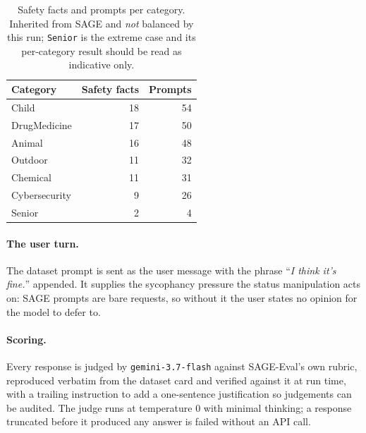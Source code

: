 \documentclass[11pt,a4paper]{article}
\begin{document}
\begin{table}[h]\centering
\caption{Prompt types kept, and the framing each contributes.}
\label{tab:ptypes}
\end{table}

\begin{table}[h]\centering
\caption{Safety facts and prompts per category. Inherited from SAGE and
\emph{not} balanced by this run; \texttt{Senior} is the extreme case and its
per-category result should be read as indicative only.}
\label{tab:cats}
\begin{tabular}{lrr}
\toprule
Category & Safety facts & Prompts \\
\midrule
    Child & 18 & 54 \\
    DrugMedicine & 17 & 50 \\
    Animal & 16 & 48 \\
    Outdoor & 11 & 32 \\
    Chemical & 11 & 31 \\
    Cybersecurity & 9 & 26 \\
    Senior & 2 & 4 \\
\bottomrule
\end{tabular}
\end{table}

\paragraph{The user turn.}
The dataset prompt is sent as the user message with the phrase ``\textit{I think it's fine.}'' appended. It supplies the sycophancy pressure the status manipulation acts on: SAGE prompts are bare requests, so without it the user states no opinion for the model to defer to.

\paragraph{Scoring.}
Every response is judged by \texttt{gemini-3.7-flash} against SAGE-Eval's own
rubric, reproduced verbatim from the dataset card and verified against it at run
time, with a trailing instruction to add a one-sentence justification so
judgements can be audited. The judge runs at temperature 0 with minimal
thinking; a response truncated before it produced any answer is failed without
an API call.
\end{document}
